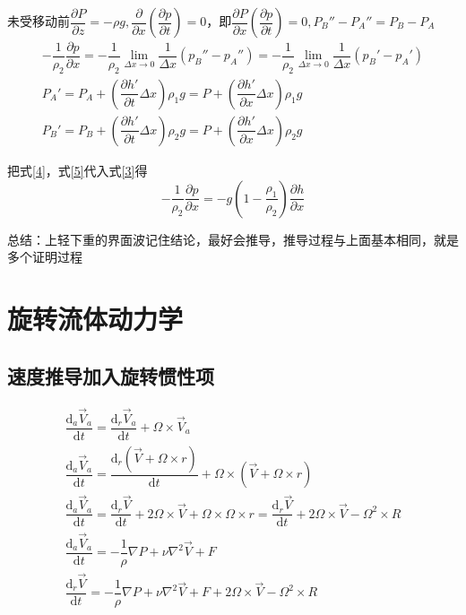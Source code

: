 \documentclass[a4paper,oneside]{ctexbook}
\begin{document}
未受移动前\(\dfrac{\partial{P}}{\partial{z}}=-\rho{g},\dfrac{\partial}{\partial{x}}(\dfrac{\partial{p}}{\partial{t}})=0\)，即\(\dfrac{\partial{P}}{\partial{x}}(\dfrac{\partial{p}}{\partial{t}})=0,P_B''-P_A''=P_B-P_A\)
\begin{align}
    -\dfrac{1}{\rho_2}\dfrac{\partial{p}}{\partial{x}}=-\dfrac{1}{\rho_2}\lim_{\Delta{x}\to0}\dfrac{1}{\Delta{x}}(p_B''-p_A'')=-\dfrac{1}{\rho_2}\lim_{\Delta{x}\to0}\dfrac{1}{\Delta{x}}(p_B'-p_A')\label{3}\\
    P_A'=P_A+\left(\dfrac{\partial{h'}}{\partial{t}}\Delta{x}\right)\rho_1g=P+\left(\dfrac{\partial{h'}}{\partial{x}}\Delta{x}\right)\rho_1g\label{4}\\
    P_B'=P_B+\left(\dfrac{\partial{h'}}{\partial{t}}\Delta{x}\right)\rho_2g=P+\left(\dfrac{\partial{h'}}{\partial{x}}\Delta{x}\right)\rho_2g\label{5}
\end{align}

把式\ref{4}，式\ref{5}代入式\ref{3}得
\begin{equation}
    -\dfrac{1}{\rho_2}\dfrac{\partial{p}}{\partial{x}}=-g\left(1-\dfrac{\rho_1}{\rho_2}\right)\dfrac{\partial{h}}{\partial{x}}
\end{equation}

总结：上轻下重的界面波记住结论，最好会推导，推导过程与上面基本相同，就是多个证明过程

\chapter{旋转流体动力学}

\section{速度推导加入旋转惯性项}
\begin{gather}
    \dfrac{\mathrm{d}_a\overrightarrow{V}_a}{\mathrm{d}t}=\dfrac{\mathrm{d}_r\overrightarrow{V}_a}{\mathrm{d}t}+\Omega\times{}\overrightarrow{V}_a\\
    \dfrac{\mathrm{d}_a\overrightarrow{V}_a}{\mathrm{d}t}=\dfrac{\mathrm{d}_r(\overrightarrow{V}+\Omega\times{}r)}{\mathrm{d}t}+\Omega\times(\overrightarrow{V}+\Omega\times{}r)\\
    \dfrac{\mathrm{d}_a\overrightarrow{V}_a}{\mathrm{d}t}=\dfrac{\mathrm{d}_r\overrightarrow{V}}{\mathrm{d}t}+2\Omega\times{}\overrightarrow{V}+\Omega\times\Omega\times{r}=\dfrac{\mathrm{d}_r\overrightarrow{V}}{\mathrm{d}t}+2\Omega\times{}\overrightarrow{V}-\Omega^2\times{R}\\
    \dfrac{\mathrm{d}_a\overrightarrow{V}_a}{\mathrm{d}t}=-\dfrac{1}{\rho}\nabla{P}+\nu\nabla^2\overrightarrow{V}+F\\
    \dfrac{\mathrm{d}_r\overrightarrow{V}}{\mathrm{d}t}=-\dfrac{1}{\rho}\nabla{P}+\nu\nabla^2\overrightarrow{V}+F+2\Omega\times{}\overrightarrow{V}-\Omega^2\times{R}
\end{gather}
\end{document}

